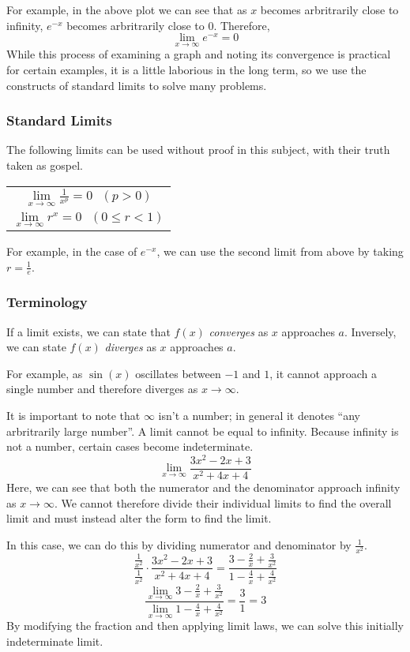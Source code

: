 \documentclass[12pt]{report}
\newcommand{\limit}{\lim\limits}
\begin{document}
\begin{flushleft}
For example, in the above plot we can see that as \(x\) becomes arbritrarily 
close to infinity, \(e^{-x}\) becomes arbritrarily close to \(0\). Therefore,
\[\lim_{x\rightarrow\infty} e^{-x} = 0\]
While this process of examining a graph and noting its convergence is practical
for certain examples, it is a little laborious in the long term, so we use the 
constructs of standard limits to solve many problems.

\subsubsection*{Standard Limits}
The following limits can be used without proof in this subject, with their 
truth taken as gospel.

\begin{center}    
    \begin{tabular}{||c||}
        \(\limit_{x\rightarrow\infty}\frac{1}{x^p} = 0 \:\:\:(p > 0)\) \\[12pt]
        \(\limit_{x\rightarrow\infty}r^x = 0 \:\:\:(0 \leq r < 1)\) \\[12pt]
    \end{tabular}
\end{center}

For example, in the case of \(e^{-x}\), we can use the second limit from above
by taking \(r = \frac{1}{e}\).

\subsubsection*{Terminology}
If a limit exists, we can state that \(f(x)\) \textit{converges} as \(x\) 
approaches \(a\). Inversely, we can state \(f(x)\) \textit{diverges} as \(x\)
approaches \(a\). \par
For example, as \(\sin(x)\) oscillates between \(-1\) and \(1\), it cannot 
approach a single number and therefore diverges as \(x\rightarrow\infty\). \par
It is important to note that \(\infty\) isn't a number; in general it denotes
``any arbritrarily large number''. A limit cannot be equal to infinity. Because
infinity is not a number, certain cases become indeterminate.
\[\limit_{x\rightarrow\infty} \frac{3x^2 - 2x + 3}{x^2 + 4x + 4}\]
Here, we can see that both the numerator and the denominator approach infinity
as \(x\rightarrow\infty\). We cannot therefore divide their individual limits 
to find the overall limit and must instead alter the form to find the limit. 
\par
In this case, we can do this by dividing numerator and denominator by 
\(\frac{1}{x^2}\).
\[\frac{\frac{1}{x^2}}{\frac{1}{x^2}} \cdot \frac{3x^2 - 2x + 3}{x^2 + 4x + 4}
= \frac{3 - \frac{2}{x} + \frac{3}{x^2}}{1 - \frac{4}{x} + \frac{4}{x^2}}\]
\[\frac{\limit_{x\rightarrow\infty} 3 - \frac{2}{x} + \frac{3}{x^2}}{
\limit_{x\rightarrow\infty} 1 - \frac{4}{x} + \frac{4}{x^2}} = 
\frac{3}{1} = 3\]
By modifying the fraction and then applying limit laws, we can solve this 
initially indeterminate limit.


\end{flushleft}
\end{document}
